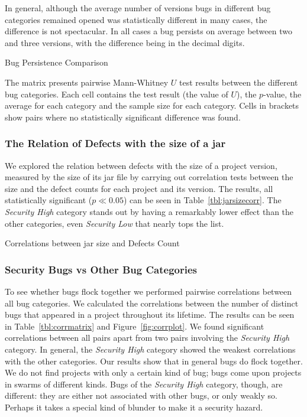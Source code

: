 \documentclass[conference]{llncs}
\begin{document}
In general, although the average number of versions bugs in different
bug categories remained opened was statistically different in many
cases, the difference is not spectacular. In all cases a bug persists
on average between two and three versions, with the difference being
in the decimal digits.

\begin{landscape}
  \begin{table}
    \caption{Bug Persistence Comparison}
    \label{tbl:bug_persistence}
    
    \small The matrix presents pairwise Mann-Whitney $U$ test results
    between the different bug categories. Each cell contains the test
    result (the value of $U$), the $p$-value, the average for each
    category and the sample size for each category. Cells in brackets show
    pairs where no statistically significant difference was found.
  \end{table}
\end{landscape}

\subsubsection{The Relation of Defects with the size of a {\sc jar}}

We explored the relation between defects with the size of a project version,
measured by the size of its {\sc jar} file by carrying out correlation tests
between the size and the defect counts for each project and its
version. The results, all statistically significant ($p \ll
0.05$) can be seen in Table~\ref{tbl:jarsizecorr}. The {\it Security
  High} category stands out by having a remarkably lower effect than
the other categories, even {\it Security Low} that nearly tops the
list. 

\begin{table}
    \centering
    \caption{Correlations between jar size and Defects Count}
    \label{tbl:jarsizecorr}
    
\end{table}

\subsubsection{Security Bugs {\sc vs} Other Bug Categories}

To see whether bugs flock together we performed pairwise correlations
between all bug categories. We calculated the correlations between the
number of distinct bugs that appeared in a project throughout its
lifetime. The results can be seen in Table~\ref{tbl:corrmatrix} and
Figure~\ref{fig:corrplot}. We found significant correlations between
all pairs apart from two pairs involving the {\it Security High}
category. In general, the {\it Security High} category showed the
weakest correlations with the other categories. Our results show that
in general bugs do flock together. We do not find projects with only a
certain kind of bug; bugs come upon projects in swarms of different
kinds. Bugs of the {\it Security High} category, though, are
different: they are either not associated with other bugs, or only
weakly so. Perhaps it takes a special kind of blunder to make it a
security hazard.
\end{document}
